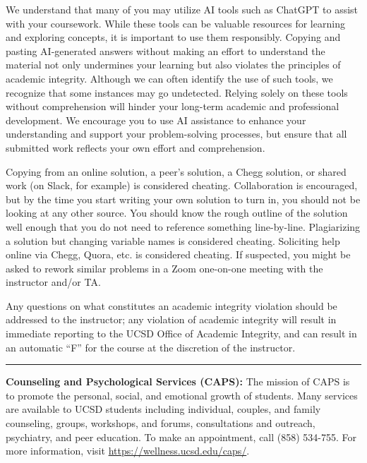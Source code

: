 \documentclass[12pt]{article}
\begin{document}
We understand that many of you may utilize AI tools such as ChatGPT to assist with your coursework.
While these tools can be valuable resources for learning and exploring concepts, it is important to use them responsibly.
Copying and pasting AI-generated answers without making an effort to understand the material not only undermines your learning but also violates the principles of academic integrity.
Although we can often identify the use of such tools, we recognize that some instances may go undetected.
Relying solely on these tools without comprehension will hinder your long-term academic and professional development.
We encourage you to use AI assistance to enhance your understanding and support your problem-solving processes, but ensure that all submitted work reflects your own effort and comprehension.

Copying from an online solution, a peer's solution, a Chegg solution, or shared work (on Slack, for example) is considered cheating.
Collaboration is encouraged, but by the time you start writing your own solution to turn in, you should not be looking at any other source.
You should know the rough outline of the solution well enough that you do not need to reference something line-by-line.
Plagiarizing a solution but changing variable names is considered cheating.
Soliciting help online via Chegg, Quora, etc. is considered cheating.
If suspected, you might be asked to rework similar problems in a Zoom one-on-one meeting with the instructor and/or TA.

Any questions on what constitutes an academic integrity violation should be addressed to the instructor; any violation of academic integrity will result in immediate reporting to the UCSD Office of Academic Integrity, and can result in an automatic ``F'' for the course at the discretion of the instructor.

\begin{center}
	\rule{\textwidth}{0.5pt}
\end{center}

\noindent\textbf{Counseling and Psychological Services (CAPS):} The mission of CAPS is to promote the personal, social, and emotional growth of students.
Many services are available to UCSD students including individual, couples, and family counseling, groups, workshops, and forums, consultations and outreach, psychiatry, and peer education.
To make an appointment, call (858) 534-755.
For more information, visit \href{https://wellness.ucsd.edu/caps/}{https://wellness.ucsd.edu/caps/}.
\end{document}
